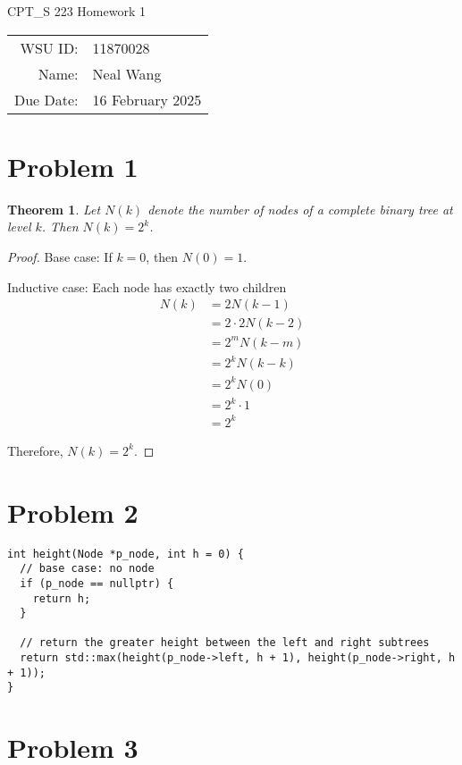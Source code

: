 \documentclass[12pt]{article}
\newtheorem{theorem}{Theorem}[section]
\theoremstyle{definition}
\begin{document}
\begin{center}
  {\Large CPT\_S 223 Homework 1}
  $ $\\
  $ $\\
  \begin{tabular}{rl}
    WSU ID: & 11870028 \\
    Name: & Neal Wang \\
    Due Date: & 16 February 2025
  \end{tabular}
\end{center}

\section{Problem 1}

\begin{theorem}
  Let $N(k)$ denote the number of nodes of a complete binary tree at level
  $k$. Then $N(k) = 2^k$.
\end{theorem}

\begin{proof}
  Base case: If $k = 0$, then $N(0) = 1$.

  Inductive case: Each node has exactly two children
  \begin{align*}
    N(k) & = 2N(k - 1) \\
    & = 2 \cdot 2N(k - 2) \\
    & = 2^mN(k - m) \\
    & = 2^kN(k - k) \\
    & = 2^kN(0) \\
    & = 2^k \cdot 1 \\
    & = 2^k
  \end{align*}

  Therefore, $N(k) = 2^k$.
\end{proof}

\section{Problem 2}

\begin{verbatim}
int height(Node *p_node, int h = 0) {
  // base case: no node
  if (p_node == nullptr) {
    return h;
  }

  // return the greater height between the left and right subtrees
  return std::max(height(p_node->left, h + 1), height(p_node->right, h + 1));
}
\end{verbatim}

\section{Problem 3}
\end{document}
